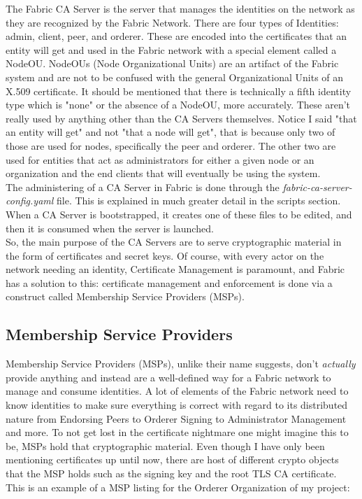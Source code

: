 		\hspace{10mm}The Fabric CA Server is the server that manages the identities on the network as they are recognized by the Fabric Network. There are four types of Identities: admin, client, peer, and orderer. These are encoded into the certificates that an entity will get and used in the Fabric network with a special element called a NodeOU. NodeOUs (Node Organizational Units) are an artifact of the Fabric system and are not to be confused with the general Organizational Units of an X.509 certificate. It should be mentioned that there is technically a fifth identity type which is "none" or the absence of a NodeOU, more accurately. These aren't really used by anything other than the CA Servers themselves. Notice I said "that an entity will get" and not "that a node will get", that is because only two of those are used for nodes, specifically the peer and orderer. The other two are used for entities that act as administrators for either a given node or an organization and the end clients that will eventually be using the system. \\
		
		\hspace{10mm}The administering of a CA Server in Fabric is done through the \textit{fabric-ca-server-config.yaml} file. This is explained in much greater detail in the scripts section. When a CA Server is bootstrapped, it creates one of these files to be edited, and then it is consumed when the server is launched. \\
		
		\hspace{10mm}So, the main purpose of the CA Servers are to serve cryptographic material in the form of certificates and secret keys. Of course, with every actor on the network needing an identity, Certificate Management is paramount, and Fabric has a solution to this: certificate management and enforcement is done via a construct called Membership Service Providers (MSPs).\\
		
	\subsection{Membership Service Providers}
		\hspace{10mm}Membership Service Providers (MSPs), unlike their name suggests, don't \textit{actually} provide anything and instead are a well-defined way for a Fabric network to manage and consume identities. A lot of elements of the Fabric network need to know identities to make sure everything is correct with regard to its distributed nature from Endorsing Peers to Orderer Signing to Administrator Management and more. To not get lost in the certificate nightmare one might imagine this to be, MSPs hold that cryptographic material. Even though I have only been mentioning certificates up until now, there are host of different crypto objects that the MSP holds such as the signing key and the root TLS CA certificate. This is an example of a MSP listing for the Orderer Organization of my project:
		
